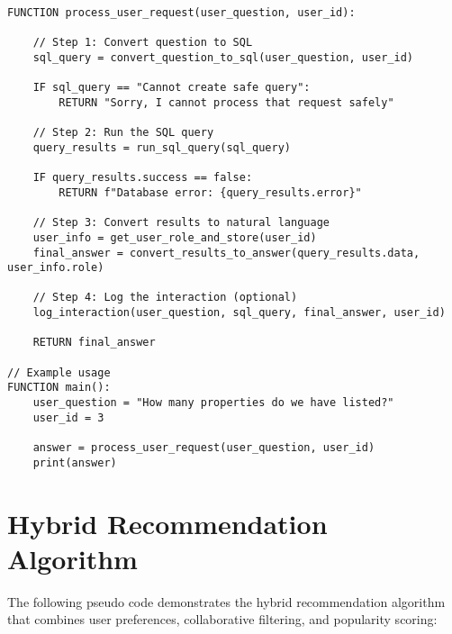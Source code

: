 \begin{verbatim}
FUNCTION process_user_request(user_question, user_id):
    
    // Step 1: Convert question to SQL
    sql_query = convert_question_to_sql(user_question, user_id)
    
    IF sql_query == "Cannot create safe query":
        RETURN "Sorry, I cannot process that request safely"
    
    // Step 2: Run the SQL query
    query_results = run_sql_query(sql_query)
    
    IF query_results.success == false:
        RETURN f"Database error: {query_results.error}"
    
    // Step 3: Convert results to natural language
    user_info = get_user_role_and_store(user_id)
    final_answer = convert_results_to_answer(query_results.data, user_info.role)
    
    // Step 4: Log the interaction (optional)
    log_interaction(user_question, sql_query, final_answer, user_id)
    
    RETURN final_answer

// Example usage
FUNCTION main():
    user_question = "How many properties do we have listed?"
    user_id = 3
    
    answer = process_user_request(user_question, user_id)
    print(answer)
\end{verbatim}

\chapter*{Hybrid Recommendation Algorithm}
\label{app:D}

The following pseudo code demonstrates the hybrid recommendation algorithm that combines user preferences, collaborative filtering, and popularity scoring:

